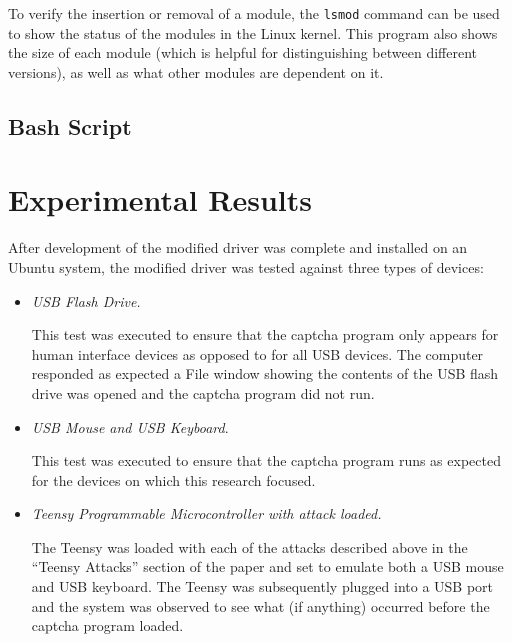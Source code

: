 \documentclass[pagenumbers]{ieee}
\begin{document}
To verify the insertion or removal of a module, the \texttt{lsmod} command can be used to show the status of the modules in the Linux kernel. This program also shows the size of each module (which is helpful for distinguishing between different versions), as well as what other modules are dependent on it.


\subsection{Bash Script}


\section{Experimental Results}

After development of the modified driver was complete and installed on an Ubuntu system, the modified driver was tested against three types of devices: 

\begin{itemize}
\item \textit{USB Flash Drive.}

This test was executed to ensure that the captcha program only appears for human interface devices as opposed to for all USB devices. The computer responded as expected \textemdash a File window showing the contents of the USB flash drive was opened and the captcha program did not run.

\item \textit{USB Mouse and USB Keyboard}.

This test was executed to ensure that the captcha program runs as expected for the devices on which this research focused.

\item \textit{Teensy Programmable Microcontroller with attack loaded.}

The Teensy was loaded with each of the attacks described above in the ``Teensy Attacks'' section of the paper and set to emulate both a USB mouse and USB keyboard. The Teensy was subsequently plugged into a USB port and the system was observed to see what (if anything) occurred before the captcha program loaded.

\end{itemize}
\end{document}
